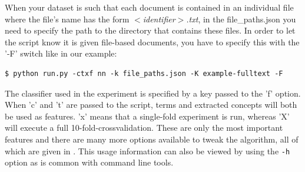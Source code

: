 \documentclass{article}
\begin{document}
When your dataset is such that each document is contained in an individual file where the file's name has the form \emph{$<$identifier$>$.txt}, in the file\_paths.json you need to specify the path
to the directory that contains these files. In order to let the script know it is given file-based documents, you have to specify this with the '-F' switch like in our example:

\begin{lstlisting}[basicstyle=\ttfamily]
$ python run.py -ctxf nn -k file_paths.json -K example-fulltext -F
\end{lstlisting}

The classifier used in the experiment is specified by a key passed to the 'f' option. When 'c' and 't' are passed to the script, terms and extracted concepts will both be used
as features. 'x' means that a single-fold experiment is run, whereas 'X' will execute a full 10-fold-crossvalidation. These are only the most important features and there are many
more options available to tweak the algorithm, all of which are given
in .
This usage information can also be viewed by using the \texttt{-h} option as is common with command line tools.
\end{document}

